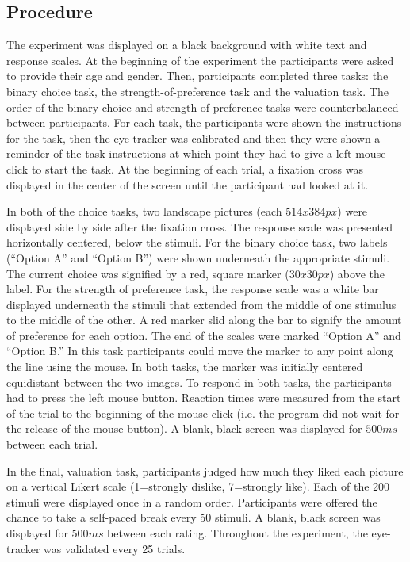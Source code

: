 \documentclass[12pt]{article}
\begin{document}
\subsection{Procedure}
The experiment was displayed on a black background with white text and response scales. At the beginning of the experiment the participants were asked to provide their age and gender. Then, participants completed three tasks: the binary choice task, the strength-of-preference task and the valuation task. The order of the binary choice and strength-of-preference tasks were counterbalanced between participants. For each task, the participants were shown the instructions for the task, then the eye-tracker was calibrated and then they were shown a reminder of the task instructions at which point they had to give a left mouse click to start the task. At the beginning of each trial, a fixation cross was displayed in the center of the screen until the participant had looked at it. 

In both of the choice tasks, two landscape pictures (each $514 x 384px$) were displayed side by side after the fixation cross. The response scale was presented horizontally centered, below the stimuli. For the binary choice task, two labels (``Option A'' and ``Option B'') were shown underneath the appropriate stimuli. The current choice was signified by a red, square marker ($30 x 30px$) above the label. For the strength of preference task, the response scale was a white bar displayed underneath the stimuli that extended from the middle of one stimulus to the middle of the other. A red marker slid along the bar to signify the amount of preference for each option. The end of the scales were marked ``Option A'' and ``Option B.'' In this task participants could move the marker to any point along the line using the mouse. In both tasks, the marker was initially centered equidistant between the two images. To respond in both tasks, the participants had to press the left mouse button. Reaction times were measured from the start of the trial to the beginning of the mouse click (i.e. the program did not wait for the release of the mouse button). A blank, black screen was displayed for $500ms$ between each trial.

In the final, valuation task, participants judged how much they liked each picture on a vertical Likert scale (1=strongly dislike, 7=strongly like). Each of the 200 stimuli were displayed once in a random order. Participants were offered the chance to take a self-paced break every 50 stimuli. A blank, black screen was displayed for $500ms$ between each rating. Throughout the experiment, the eye-tracker was validated every 25 trials.
\end{document}
